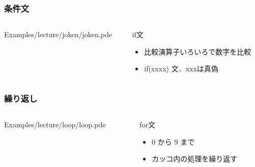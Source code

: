 \documentclass[10pt, dvipdfmx]{beamer}
\begin{document}
        \begin{frame}
            \frametitle{条件文}
            \begin{columns}[c]
                \begin{column}{0.50\textwidth}
                    \tiny
                    Examples/lecture/joken/joken.pde
                    \scriptsize
                \end{column}
                \begin{column}{0.50\textwidth}
                    \begin{block}{if文}
                        \begin{itemize}
                            \item 比較演算子いろいろで数字を比較
                            \item if(xxxx) 文．xxxは真偽
                        \end{itemize}
                    \end{block}
                \end{column}
            \end{columns}
        \end{frame}

        \begin{frame}
            \frametitle{繰り返し}
            \begin{columns}[c]
                \begin{column}{0.50\textwidth}
                    \tiny
                    Examples/lecture/loop/loop.pde
                    \scriptsize
                \end{column}
                \begin{column}{0.50\textwidth}
                    \begin{block}{for文}
                        \begin{itemize}
                            \item 0 から 9 まで
                            \item カッコ内の処理を繰り返す
                        \end{itemize}
                    \end{block}
                \end{column}
            \end{columns}
        \end{frame}
\end{document}
